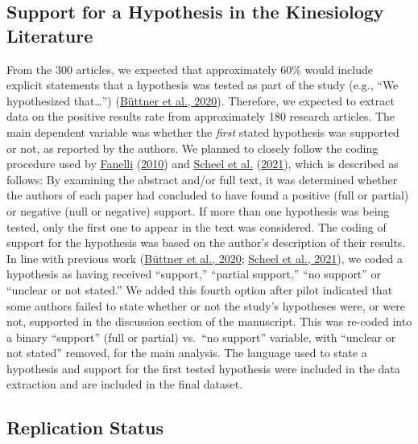 \documentclass[]{cik}%
\begin{document}
\hypertarget{support-for-a-hypothesis-in-the-kinesiology-literature}{%
\subsection{Support for a Hypothesis in the Kinesiology
Literature}\label{support-for-a-hypothesis-in-the-kinesiology-literature}}

From the 300 articles, we expected that approximately 60\% would include
explicit statements that a hypothesis was tested as part of the study
(e.g., ``We hypothesized that\ldots{}'')
(\protect\hyperlink{ref-buttner_2020}{Büttner et al., 2020}). Therefore,
we expected to extract data on the positive results rate from
approximately 180 research articles. The main dependent variable was
whether the \emph{first} stated hypothesis was supported or not, as
reported by the authors. We planned to closely follow the coding
procedure used by \protect\hyperlink{ref-fanelli_positive_2010}{Fanelli}
(\protect\hyperlink{ref-fanelli_positive_2010}{2010}) and
\protect\hyperlink{ref-scheel_excess_2020}{Scheel et al.}
(\protect\hyperlink{ref-scheel_excess_2020}{2021}), which is described
as follows: By examining the abstract and/or full text, it was
determined whether the authors of each paper had concluded to have found
a positive (full or partial) or negative (null or negative) support. If
more than one hypothesis was being tested, only the first one to appear
in the text was considered. The coding of support for the hypothesis was
based on the author's description of their results. In line with
previous work (\protect\hyperlink{ref-buttner_2020}{Büttner et al.,
2020}; \protect\hyperlink{ref-scheel_excess_2020}{Scheel et al., 2021}),
we coded a hypothesis as having received ``support,'' ``partial
support,'' ``no support'' or ``unclear or not stated.'' We added this
fourth option after pilot indicated that some authors failed to state
whether or not the study's hypotheses were, or were not, supported in
the discussion section of the manuscript. This was re-coded into a
binary ``support'' (full or partial) vs.~``no support'' variable, with
``unclear or not stated'' removed, for the main analysis. The language
used to state a hypothesis and support for the first tested hypothesis
were included in the data extraction and are included in the final
dataset.

\hypertarget{replication-status}{%
\subsection{Replication Status}\label{replication-status}}
\end{document}
